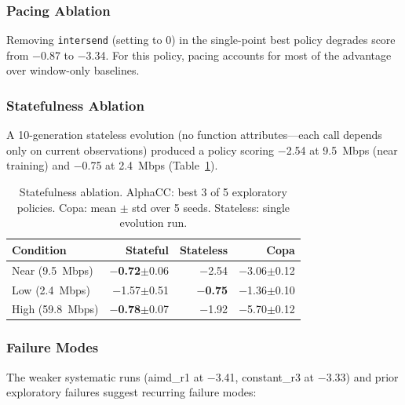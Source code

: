 \subsubsection{Pacing Ablation}
\label{sec:pacing_ablation}


Removing \texttt{intersend} (setting to 0) in the single-point best policy
degrades score from $-$0.87 to $-$3.34. For this policy,
pacing accounts for most of the advantage over window-only baselines.

\subsubsection{Statefulness Ablation}
\label{sec:statefulness_ablation}

A 10-generation stateless evolution (no function attributes---each call
depends only on current observations) produced a policy scoring $-$2.54
at 9.5~Mbps (near training) and $-$0.75 at 2.4~Mbps
(Table~\ref{tab:ablation}).

\begin{table}[t]
\centering
\caption{Statefulness ablation. AlphaCC: best 3 of 5 exploratory
policies. Copa: mean $\pm$ std over 5 seeds. Stateless: single
evolution run.}
\label{tab:ablation}
\footnotesize
\begin{tabular}{@{}lrrr@{}}
\toprule
Condition & Stateful & Stateless & Copa \\
\midrule
Near (9.5~Mbps) & \textbf{$-$0.72}{\scriptsize$\pm$0.06} & $-$2.54 & $-$3.06{\scriptsize$\pm$0.12} \\
Low (2.4~Mbps) & $-$1.57{\scriptsize$\pm$0.51} & \textbf{$-$0.75} & $-$1.36{\scriptsize$\pm$0.10} \\
High (59.8~Mbps) & \textbf{$-$0.78}{\scriptsize$\pm$0.07} & $-$1.92 & $-$5.70{\scriptsize$\pm$0.12} \\
\bottomrule
\end{tabular}
\end{table}

\subsubsection{Failure Modes}
\label{sec:failures}

The weaker systematic runs (aimd\_r1 at $-$3.41, constant\_r3 at $-$3.33)
and prior exploratory failures suggest recurring
failure modes:

